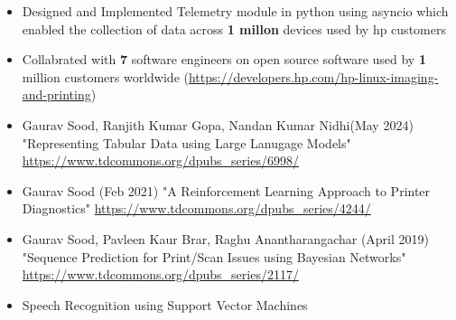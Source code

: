 \documentclass[10pt,a4paper,ragged2e,withhyper]{altacv}
\begin{document}
\begin{paracol}{1}
\par\divider
{}
\begin{itemize}
\item Designed and Implemented Telemetry module in python using asyncio which
enabled the collection of data across \textbf{\textbf{1 millon}} devices used by hp customers
\item Collabrated with \textbf{\textbf{7}} software engineers on open source software used by \textbf{\textbf{1}}
million customers worldwide (\url{https://developers.hp.com/hp-linux-imaging-and-printing})
\end{itemize}


\label{sec:orgb66e032}
\begin{itemize}
\item Gaurav Sood, Ranjith Kumar Gopa, Nandan Kumar Nidhi(May 2024) "Representing
Tabular Data using Large Lanugage Models"
\url{https://www.tdcommons.org/dpubs\_series/6998/}
\item Gaurav Sood (Feb 2021) "A Reinforcement Learning Approach to Printer Diagnostics"
\url{https://www.tdcommons.org/dpubs\_series/4244/}
\item Gaurav	Sood, Pavleen Kaur Brar, Raghu Anantharangachar (April 2019)
"Sequence Prediction for Print/Scan Issues using Bayesian Networks"
\url{https://www.tdcommons.org/dpubs\_series/2117/}
\end{itemize}

\label{sec:org2db764a}
\nocite{*}
\printbibliography[heading=pubtype,title={\printinfo{\faUsers}{Conference Proceedings}},type=inproceedings]

\label{sec:org9b2d2b5}
\begin{itemize}
\item \faBook Speech Recognition using Support Vector Machines
\end{itemize}

\divider


\end{paracol}
\end{document}
